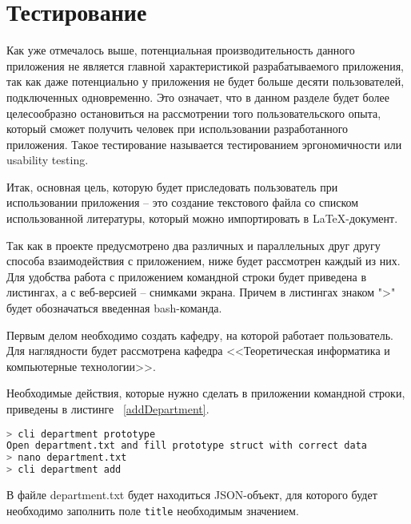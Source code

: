 \section*{Тестирование}

Как уже отмечалось выше, потенциальная производительность данного приложения не является главной характеристикой
разрабатываемого приложения, так как даже потенциально у приложения не будет больше десяти пользователей,
подключенных одновременно. Это означает, что в данном разделе будет более целесообразно остановиться на
рассмотрении того пользовательского опыта, который сможет получить человек при использовании разработанного
приложения. Такое тестирование называется тестированием эргономичности или usability testing.

Итак, основная цель, которую будет приследовать пользователь при использовании приложения -- это создание
текстового файла со списком использованной литературы, который можно импортировать в LaTeX-документ.

Так как в проекте предусмотрено два различных и параллельных друг другу способа взаимодействия с приложением,
ниже будет рассмотрен каждый из них. Для удобства работа с приложением командной строки будет приведена
в листингах, а с веб-версией -- снимками экрана. Причем в листингах знаком ">" будет обозначаться введенная
bash-команда.

Первым делом необходимо создать кафедру, на которой работает пользователь. Для наглядности будет рассмотрена
кафедра <<Теоретическая информатика и компьютерные технологии>>.

Необходимые действия, которые нужно сделать в приложении командной строки, приведены в листинге ~\ref{addDepartment}.

\begin{lstlisting}[language=bash, caption = {Добавление кафедры}, captionpos=b, label={addDepartment}]
> cli department prototype
Open department.txt and fill prototype struct with correct data
> nano department.txt 
> cli department add
\end{lstlisting}

В файле department.txt будет находиться JSON-объект, для которого будет необходимо заполнить поле \texttt{title}
необходимым значением.
